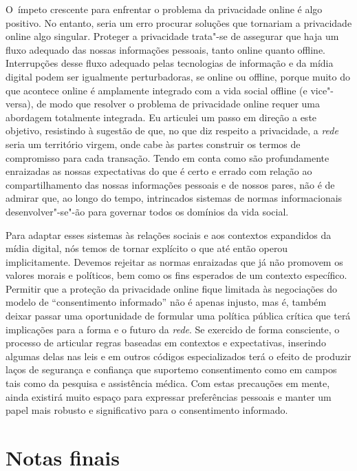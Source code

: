 O~ímpeto crescente para enfrentar o problema da privacidade online é
algo positivo. No entanto, seria um erro procurar soluções que tornariam
a privacidade online algo singular. Proteger a privacidade trata"-se de
assegurar que haja um fluxo adequado das nossas informações pessoais,
tanto online quanto offline. Interrupções desse fluxo adequado pelas
tecnologias de informação e da mídia digital podem ser igualmente
perturbadoras, se online ou offline, porque muito do que acontece online
é amplamente integrado com a vida social offline (e vice"-versa), de modo
que resolver o problema de privacidade online requer uma abordagem
totalmente integrada. Eu articulei um passo em direção a este objetivo,
resistindo à sugestão de que, no que diz respeito a privacidade, a
\emph{rede} seria um território virgem, onde cabe às partes construir os
termos de compromisso para cada transação. Tendo em conta como são
profundamente enraizadas as nossas expectativas do que é certo e errado
com relação ao compartilhamento das nossas informações pessoais e de
nossos pares, não é de admirar que, ao longo do tempo, intrincados
sistemas de normas informacionais desenvolver"-se"-ão para governar todos
os domínios da vida social.

Para adaptar esses sistemas às relações sociais e aos contextos
expandidos da mídia digital, nós temos de tornar explícito o que até
então operou implicitamente. Devemos rejeitar as normas enraizadas que
já não promovem os valores morais e políticos, bem como os fins
esperados de um contexto específico. Permitir que a proteção da
privacidade online fique limitada às negociações do modelo de
``consentimento informado'' não é apenas injusto, mas é, também deixar
passar uma oportunidade de formular uma política pública crítica que
terá implicações para a forma e o futuro da \emph{rede}. Se exercido de
forma consciente, o processo de articular regras baseadas em contextos e
expectativas, inserindo algumas delas nas leis e em outros códigos
especializados terá o efeito de produzir laços de segurança e confiança
que suportemo consentimento como em campos tais como da pesquisa e
assistência médica. Com estas precauções em mente, ainda existirá muito
espaço para expressar preferências pessoais e manter um papel mais
robusto e significativo para o consentimento informado.

\section{Notas finais}

